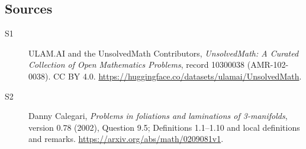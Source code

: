 \documentclass[11pt]{article}
\begin{document}
\subsection{Sources}
\begin{description}
\item[\hypertarget{source:10300038:1}{S1}] ULAM.AI and the UnsolvedMath Contributors, \emph{UnsolvedMath: A Curated Collection of Open Mathematics Problems}, record 10300038 (AMR-102-0038). CC BY 4.0. \url{https://huggingface.co/datasets/ulamai/UnsolvedMath}.
\item[\hypertarget{source:10300038:2}{S2}] Danny Calegari, \emph{Problems in foliations and laminations of 3-manifolds}, version 0.78 (2002), Question 9.5; Definitions 1.1--1.10 and local definitions and remarks. \url{https://arxiv.org/abs/math/0209081v1}.
\end{description}
\label{end:10300038}
\end{document}
